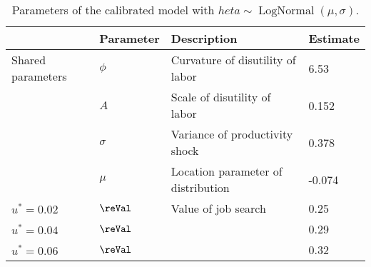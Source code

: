 \begin{table}\centering 
	    \renewcommand{\arraystretch}{1.7} 
	     \begin{tabular}{@{}llll@{}} \toprule 
	 	 & Parameter & Description & Estimate  \\ 
\midrule  
 Shared parameters & $\phi$ & Curvature of disutility of labor   & 6.53 \\ 
 & $A$    & Scale of disutility of labor       & 0.152 \\ 
 & $\sigma$ & Variance of productivity shock     & 0.378 \\ 
  & $\mu$    & Location parameter of distribution & -0.074 \\ 
 $u^* = 0.02 $ & $\reVal$ & Value of job search & 0.25 \\ 
 $u^* = 0.04 $ & $\reVal$ &                     & 0.29 \\ 
 $u^* = 0.06 $ & $\reVal$ &                     & 0.32 \\ 
	 	 \bottomrule 
	 \end{tabular} 
	 \caption{Parameters of the calibrated model with $	heta \sim \operatorname{LogNormal}(\mu, \sigma)$.} 
	 \label{tab:estimates} 
\end{table}